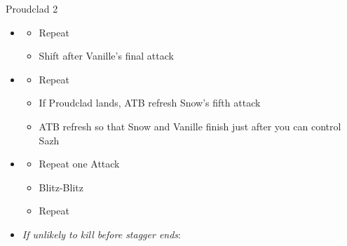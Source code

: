\begin{battle}{Proudclad 2}
\begin{multicols}{2}
\begin{itemize}
\begin{itemize}
\begin{itemize}
                      \item Auto-chain 2 spells
                      \item Cold Blood
                    \end{itemize}
              \item \textit{Muon Blaster $\rightarrow$ Oneiric Maelstrom}
                    \begin{itemize}
                      \item Renew to prevent Sazh from Launching
                      \item Cold Blood
                    \end{itemize}
              \item \textit{Muon Blaster $\rightarrow$ Muon Blaster}
                    \begin{itemize}
                      \item Cold Blood to prevent Sazh's interruption
                    \end{itemize}
              \item ATB refresh after Cold Blood starts to maximize Launches
            \end{itemize}
      \item \fifth
            \begin{itemize}
              \item Repeat
              \item Shift after Vanille's final attack
            \end{itemize}
      \item \first
            \begin{itemize}
              \item Repeat
              \item If Proudclad lands, ATB refresh Snow's fifth attack
              \item ATB refresh so that Snow and Vanille finish just after you can control Sazh
            \end{itemize}
      \item \second
            \begin{itemize}
              \item Repeat one Attack
              \item Blitz-Blitz
              \item Repeat
            \end{itemize}
            \columnbreak
      \item \textit{If unlikely to kill before stagger ends}:

\end{itemize}
\end{multicols}
\end{battle}
